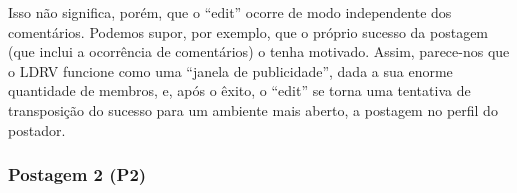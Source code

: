 \documentclass{textolivre}
\begin{document}
Isso não significa, porém, que o “edit” ocorre de modo independente dos comentários. Podemos supor, por exemplo, que o próprio sucesso da postagem (que inclui a ocorrência de comentários) o tenha motivado. Assim, parece-nos que o LDRV funcione como uma “janela de publicidade”, dada a sua enorme quantidade de membros, e, após o êxito, o “edit” se torna uma tentativa de transposição do sucesso para um ambiente mais aberto, a postagem no perfil do postador.


\subsubsection{Postagem 2 (P2)}\label{sec-postagem2}


\begin{figure}[htbp]
 \begin{minipage}{.45\textwidth}
 \centering

\end{minipage}
\end{figure}
\end{document}
